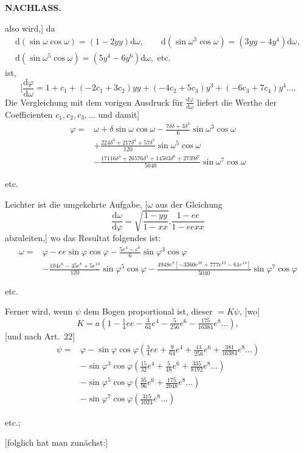 \par\clearpage
{}\hfill{\small\textbf{NACHLASS.}}\hfill\null\par\medskip
\noindent also wird,] da
\[
\begin{gathered}
\mathrm d(\sin\omega\cos\omega)=(1-2yy)\mathrm d\omega,\qquad
\mathrm d(\sin\omega^3\cos\omega)=(3yy-4y^4)\mathrm d\omega,\\
\mathrm d(\sin\omega^5\cos\omega)=(5y^4-6y^6)\mathrm d\omega,\text{ etc.}
\end{gathered}
\]
\noindent ist,
\[
[\frac{\mathrm d\varphi}{\mathrm d\omega}=1+c_1+(-2c_1+3c_2)yy+(-4c_2+5c_3)y^3+(-6c_3+7c_4)y^4\ldots.
\]
Die Vergleichung mit dem vorigen Ausdruck für \(\frac{\mathrm d\varphi}{\mathrm d\omega}\) liefert die Werthe der Coefficienten \(c_1,c_2,c_3,\ldots\) und damit]
\[
\begin{aligned}
\varphi={}&\omega+\delta\sin\omega\cos\omega-\frac{7\delta\delta+3\delta^3}{6}\sin\omega^3\cos\omega\\
&+\frac{224\delta^3+217\delta^4+57\delta^5}{120}\sin\omega^5\cos\omega\\
&-\frac{17116\delta^4+26576\delta^5+14503\delta^6+2739\delta^7}{5040}\sin\omega^7\cos\omega
\end{aligned}
\]
{\centering etc.\par}
\bigskip
{\centering [24.]\par}
Leichter ist die umgekehrte Aufgabe, [\(\omega\) aus der Gleichung
\[
\frac{\mathrm d\omega}{\mathrm d\varphi}=\sqrt{\frac{1-yy}{1-xx}}.\frac{1-ee}{1-eexx}
\]
\noindent abzuleiten,] wo das Resultat folgendes ist:
\[
\begin{aligned}
\omega={}&\varphi-ee\sin\varphi\cos\varphi-\frac{5e^4-e^6}{6}\sin\varphi^3\cos\varphi\\
&-\frac{104e^6-45e^8+5e^{10}}{120}\sin\varphi^5\cos\varphi
-\frac{4948e^8[-3360e^{10}+777e^{12}-61e^{14}]}{5040}\sin\varphi^7\cos\varphi
\end{aligned}
\]
{\centering etc.\par}
Ferner wird, wenn \(\psi\) dem Bogen proportional ist, dieser \(=K\psi\), [wo]
\[K=a(1-\tfrac14ee-\tfrac3{64}e^4-\tfrac5{256}e^6-\tfrac{175}{16384}e^8\ldots),\]
[und nach Art.~22]
\[
\begin{aligned}
\psi={}&\varphi-\sin\varphi\cos\varphi(\tfrac34ee+\tfrac9{64}e^4+\tfrac{13}{256}e^6+\tfrac{381}{16384}e^8\ldots)\\
&-\sin\varphi^3\cos\varphi(\tfrac{15}{32}e^4+\tfrac5{48}e^6+\tfrac{335}{8192}e^8\ldots)\\
&-\sin\varphi^5\cos\varphi(\tfrac{35}{96}e^6+\tfrac{175}{2048}e^8\ldots)\\
&-\sin\varphi^7\cos\varphi(\tfrac{315}{1024}e^8\ldots)
\end{aligned}
\]
{\centering etc.;\par}
[folglich hat man zunächst:]

